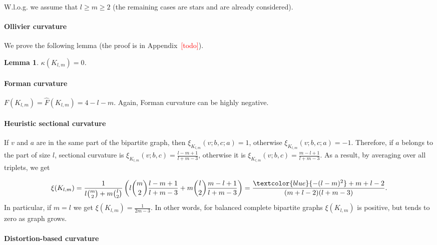 \documentclass{article} %
\newtheorem{lemma}[theorem]{Lemma}
\newcommand{\ph}[1]{\textcolor{blue}{#1}}
\begin{document}
W.l.o.g. we assume that $l \ge m \ge 2$ (the remaining cases are stars and are already considered).

\paragraph{Ollivier curvature}  
We prove the following lemma (the proof is in Appendix~\textcolor{red}{[todo]}).

\begin{lemma}\label{lem:bipartite_ollivier}
$\kappa(K_{l,m}) = 0$.
\end{lemma}

\paragraph{Forman curvature} 

$F(K_{l,m}) = \hat F(K_{l,m}) = 4 - l - m$. Again, Forman curvature can be highly negative.


\paragraph{Heuristic sectional curvature} If $v$ and $a$ are in the same part of the bipartite graph, then $\xi_{K_{l,m}}(v;b,c;a) = 1$, otherwise $\xi_{K_{l,m}}(v;b,c;a) = -1$. Therefore, if $a$ belongs to the part of size $l$, sectional curvature is
$\xi_{K_{l,m}}(v;b,c) = \frac{l-m+1}{l+m-3}$, otherwise it is $\xi_{K_{l,m}}(v;b,c) = \frac{m-l+1}{l+m-3}$. As a result, by averaging over all triplets, we get

\[
\xi({K_{l,m}}) = \frac{1}{l \binom{m}{2} + m \binom{l}{2}} \left(l \binom{m}{2} \frac{l-m+1}{l+m-3} + m \binom{l}{2} \frac{m-l+1}{l+m-3}\right) = \frac{\ph{-(l - m)^2} + m + l - 2}{(m+l-2)(l+m-3)}.
\]
In particular, if $m = l$ we get $\xi({K_{l,m}}) = \frac{1}{2m - 3}$. In other words, for balanced complete bipartite graphs $\xi({K_{l,m}})$ is positive, but tends to zero as graph grows.

\paragraph{Distortion-based curvature} 
\end{document}
